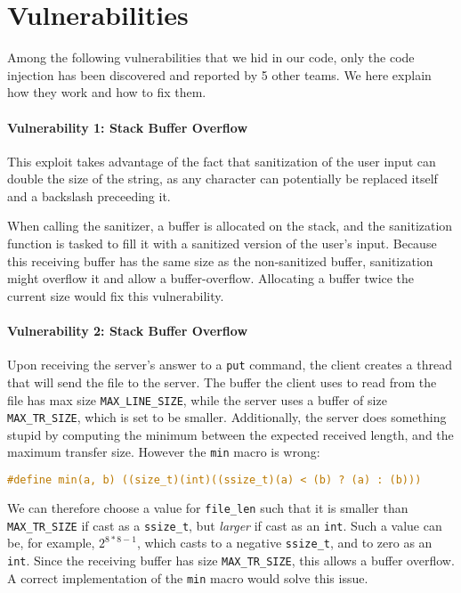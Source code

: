 \documentclass[8pt, oneside, letterpaper]{book}
\renewcommand*{\[}{[\![}
\renewcommand*{\]}{]\!]}
\begin{document}
\section* {Vulnerabilities}
Among the following vulnerabilities that we hid in our code, only the code
injection has been discovered and reported by 5 other teams. We here explain how
they work and how to fix them.

\paragraph {Vulnerability 1: Stack Buffer Overflow}

This exploit takes advantage of the fact that sanitization of the user input can
double the size of the string, as any character can potentially be replaced
itself and a backslash preceeding it.

When calling the sanitizer, a buffer is allocated on the stack, and the
sanitization function is tasked to fill it with a sanitized version of the
user's input. Because this receiving buffer has the same size as the
non-sanitized buffer, sanitization might overflow it and allow a
buffer-overflow. Allocating a buffer twice the current size would fix this
vulnerability.

\paragraph {Vulnerability 2: Stack Buffer Overflow}
Upon receiving the server's answer to a \texttt{put} command, the client creates
a thread that will send the file to the server. The buffer the client uses to
read from the file has max size \texttt{MAX\_LINE\_SIZE}, while the server uses
a buffer of size \texttt{MAX\_TR\_SIZE}, which is set to be smaller.
Additionally, the server does something stupid by computing the minimum between
the expected received length, and the maximum transfer size. However the
\texttt{min} macro is wrong:
\begin{lstlisting}[language=C]
  #define min(a, b) ((size_t)(int)((ssize_t)(a) < (b) ? (a) : (b)))
\end{lstlisting}
We can therefore choose a value for \texttt{file\_len} such that it is smaller
than \texttt{MAX\_TR\_SIZE} if cast as a \texttt{ssize\_t}, but \emph{larger} if
cast as an \texttt{int}. Such a value can be, for example, $2^{8 * 8 - 1}$,
which casts to a negative \texttt{ssize\_t}, and to zero as an \texttt{int}.
Since the receiving buffer has size \texttt{MAX\_TR\_SIZE}, this allows a buffer
overflow. A correct implementation of the \texttt{min} macro would solve this
issue.
\end{document}
